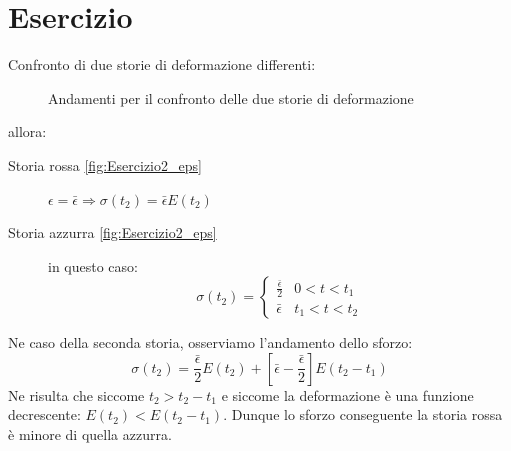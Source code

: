 \section{Esercizio}
Confronto di due storie di deformazione differenti:

\begin{figure}
\centering
{}\quad
{}
\caption{Andamenti per il confronto delle due storie di deformazione}
\label{fig:Esercizio2}
\end{figure}

allora:
\begin{description}
\item[Storia rossa \ref{fig:Esercizio2_eps}] $\epsilon = \bar{\epsilon} \Rightarrow \sigma(t_2) = \bar{\epsilon}E(t_2)$
\item[Storia azzurra \ref{fig:Esercizio2_eps}] in questo caso:
\begin{equation}
\sigma(t_2) =%
\begin{cases}
\frac{\bar{\epsilon}}{2} &0<t<t_1\\
\bar{\epsilon} &t_1<t<t_2
\end{cases}
\end{equation}
\end{description}
Ne caso della seconda storia, osserviamo l'andamento dello sforzo:
\begin{equation}
\sigma(t_2) = \frac{\bar{\epsilon}}{2}E(t_2) + [\bar{\epsilon} - \frac{\bar{\epsilon}}{2}]E(t_2 - t_1)
\end{equation}
Ne risulta che siccome $t_2 > t_2-t_1$ e siccome la deformazione è una funzione decrescente: $E(t_2)< E(t_2-t_1)$.
Dunque lo sforzo conseguente la storia rossa è minore di quella azzurra.

